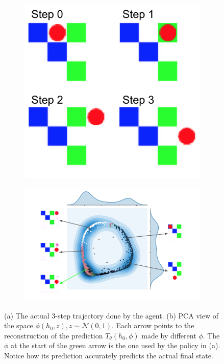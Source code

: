 \begin{figure}
\centering
\begin{subfigure}{.45\textwidth}
{{\includegraphics[width=.65\linewidth]{articles/icf/figures/square_traj.png}}} %
\end{subfigure}
\begin{subfigure}{.45\textwidth}
{{\includegraphics[width=.90\linewidth]{articles/icf/figures/phi_space.png}}}
\end{subfigure}

\caption{(a) The actual 3-step trajectory done by the agent. (b) PCA view of the space $\phi(h_0, z), z \sim \mathcal{N}(0,1)$. Each arrow points to the reconstruction of the prediction $T_\theta(h_0, \phi)$ made by different $\phi$. The $\phi$ at the start of the green arrow is the one used by the policy in (a). Notice how its prediction accurately predicts the actual final state.}
\end{figure}





